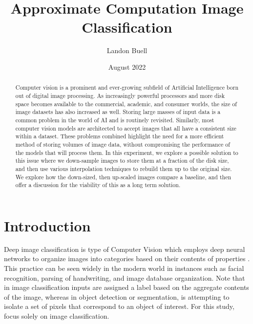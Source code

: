 \documentclass{IEEEtran}
\title{Approximate Computation Image Classification}
\author{Landon Buell}
\date{August 2022}
\begin{document}
\maketitle

\begin{abstract}

Computer vision is a prominent and ever-growing subfield of Artificial Intelligence born out of digital image processing.  As increasingly powerful processors and more disk space becomes available to the commercial, academic, and consumer worlds, the size of image datasets has also increased as well. Storing large masses of input data is a common problem in the world of AI and is routinely revisited. Similarly, most computer vision models are architected to accept images that all have a consistent size within a dataset. These problems combined highlight the need for a more efficient method of storing volumes of image data, without compromising the performance of the models that will process them. In this experiment, we explore a possible solution to this issue where we down-sample images to store them at a fraction of the disk size, and then use various interpolation techniques to rebuild them up to the original size. We explore how the down-sized, then up-scaled images compare a baseline, and then offer a discussion for the viability of this as a long term solution. 

\end{abstract}

\section{Introduction}

Deep image classification is type of Computer Vision which employs deep neural networks to organize images into categories based on their contents of properties \cite{Goodfellow,Loy}. This practice can be seen widely in the modern world in instances such as facial recognition, parsing of handwriting, and image database organization. Note that in image classification inputs are assigned a label based on the aggregate contents of the image, whereas in object detection or segmentation, is attempting to isolate a set of pixels that correspond to an object of interest. For this study, focus solely on image classification.
\end{document}

